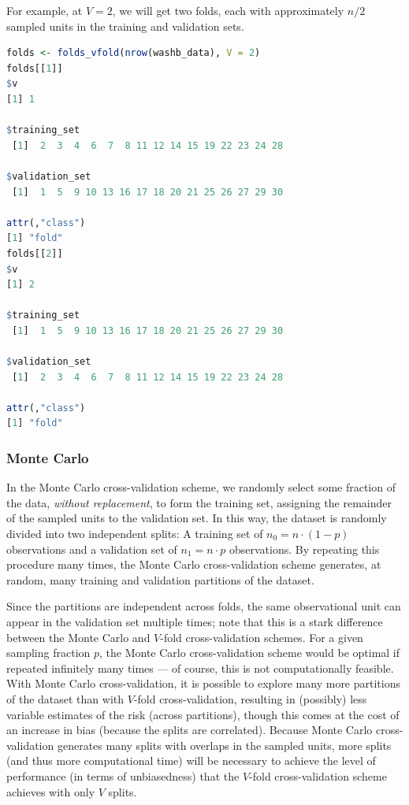 \documentclass[
  12pt, krantz2,
]{krantz}
\newcommand{\1}{\mathbbm{1}}
\theoremstyle{definition}
\theoremstyle{definition}
\theoremstyle{definition}
\theoremstyle{definition}
\theoremstyle{remark}
\begin{document}
For example, at \(V=2\), we will get two folds, each with approximately \(n/2\)
sampled units in the training and validation sets.

\begin{lstlisting}[language=R]
folds <- folds_vfold(nrow(washb_data), V = 2)
folds[[1]]
$v
[1] 1

$training_set
 [1]  2  3  4  6  7  8 11 12 14 15 19 22 23 24 28

$validation_set
 [1]  1  5  9 10 13 16 17 18 20 21 25 26 27 29 30

attr(,"class")
[1] "fold"
folds[[2]]
$v
[1] 2

$training_set
 [1]  1  5  9 10 13 16 17 18 20 21 25 26 27 29 30

$validation_set
 [1]  2  3  4  6  7  8 11 12 14 15 19 22 23 24 28

attr(,"class")
[1] "fold"
\end{lstlisting}

\hypertarget{monte-carlo}{%
\subsubsection{Monte Carlo}\label{monte-carlo}}

In the Monte Carlo cross-validation scheme, we randomly select some fraction of
the data, \emph{without replacement}, to form the training set, assigning the
remainder of the sampled units to the validation set. In this way, the dataset
is randomly divided into two independent splits: A training set of \(n_0 = n \cdot (1 - p)\) observations and a validation set of \(n_1 = n \cdot p\)
observations. By repeating this procedure many times, the Monte Carlo
cross-validation scheme generates, at random, many training and validation
partitions of the dataset.

Since the partitions are independent across folds, the same observational unit
can appear in the validation set multiple times; note that this is a stark
difference between the Monte Carlo and \(V\)-fold cross-validation schemes. For a
given sampling fraction \(p\), the Monte Carlo cross-validation scheme would be
optimal if repeated infinitely many times --- of course, this is not
computationally feasible. With Monte Carlo cross-validation, it is possible to
explore many more partitions of the dataset than with \(V\)-fold cross-validation,
resulting in (possibly) less variable estimates of the risk (across partitions),
though this comes at the cost of an increase in bias (because the splits are
correlated). Because Monte Carlo cross-validation generates many splits with
overlaps in the sampled units, more splits (and thus more computational time)
will be necessary to achieve the level of performance (in terms of unbiasedness)
that the \(V\)-fold cross-validation scheme achieves with only \(V\) splits.
\end{document}
